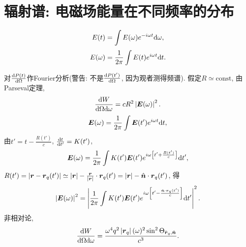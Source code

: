 \section{辐射谱: 电磁场能量在不同频率的分布}

\begin{equation}
    E(t)=\int E(\omega)e^{-i\omega t}\mathrm{d}\omega,
\end{equation}
\begin{equation}
    E(\omega)=\frac{1}{2\pi}\int E(t)e^{i\omega t}\mathrm{d} t.
\end{equation}

对$\frac{\mathrm{d} P(t)}{\mathrm{d} \Omega}$作Fourier分析(警告: 不是$\frac{\mathrm{d} P(t')}{\mathrm{d} \Omega}$, 因为观者测得频谱). 假定$R\simeq\text{const}$, 由Parseval定理,
\begin{equation}
    \frac{\mathrm{d} W}{\mathrm{d}\Omega\mathrm{d}\omega}=cR^2\left\lvert\boldsymbol{E}(\omega)\right\rvert^2.
\end{equation}
\begin{equation}
    \boldsymbol{E}(\omega)=\frac{1}{2\pi}\int \boldsymbol{E}(t')e^{i\omega t}\mathrm{d} t,
\end{equation}
由$t'=t-\frac{R(t')}{c}$, $\frac{\mathrm{d} t}{\mathrm{d} t'}=K(t')$,
\begin{equation}
    \boldsymbol{E}(\omega)=\frac{1}{2\pi}\int K(t')\boldsymbol{E}(t')e^{i\omega \left[t'+\frac{R(t')}{c}\right]}\mathrm{d} t',
\end{equation}
$R(t')=\left\lvert\boldsymbol{r}-\boldsymbol{r}_q(t')\right\rvert\simeq\left\lvert\boldsymbol{r}\right\rvert-\frac{\boldsymbol{r}}{\left\lvert\boldsymbol{r}\right\rvert}\cdot\boldsymbol{r}_q(t')=\left\lvert\boldsymbol{r}\right\rvert-\hat{\boldsymbol{n}}\cdot\boldsymbol{r}_q(t')$, 得
\begin{equation}
    \left\lvert\boldsymbol{E}(\omega)\right\rvert^2=
    \left\lvert\frac{1}{2\pi}\int K(t')\boldsymbol{E}(t')e^{i\omega \left[t'-\frac{\hat{\boldsymbol{n}}\cdot\boldsymbol{r}_q(t')}{c}\right]}\mathrm{d} t'\right\rvert^2.
\end{equation}
非相对论,
\begin{equation}
    \frac{\mathrm{d} W}{\mathrm{d}\Omega\mathrm{d}\omega}
    =\frac{\omega^4q^2\left\lvert{\boldsymbol{r}}_q\right\rvert(\omega)^2\sin^2
    \Theta_{\ddot{\boldsymbol{r}}_q,\hat{\boldsymbol{n}}}}{c^3}.
\end{equation}
